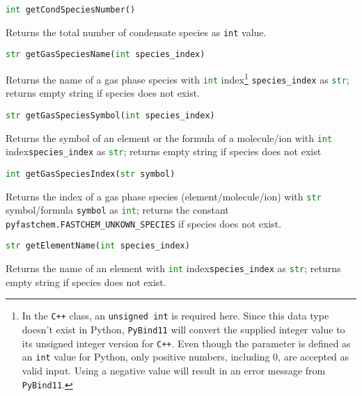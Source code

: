 \documentclass[numbers=noenddot]{aux/fcmanual}
\newcommand{\cpp}{\ttt{C++}\xspace}
\newcommand{\pb}{\texttt{PyBind11}\xspace}
\newcommand{\ttt}[1]{\texttt {#1}}
\begin{document}
\bigbreak

\lstinline[language=Python]!int getCondSpeciesNumber()!
\begin{addmargin}[25pt]{0pt}
	Returns the total number of condensate species as \lstinline!int! value.
\end{addmargin}

\bigbreak

\lstinline[language=Python]!str getGasSpeciesName(int species_index)!
\begin{addmargin}[25pt]{0pt}
	Returns the name of a gas phase species with \lstinline[language=Python]!int! index\footnote{In the \cpp class, an \lstinline!unsigned int! is required here. Since this data type doesn't exist in Python, \pb will convert the supplied integer value to its unsigned integer version for \cpp. Even though the parameter is defined as an \lstinline!int! value for Python, only positive numbers, including 0, are accepted as valid input. Using a negative value will result in an error message from \pb.} \lstinline!species_index! as \lstinline[language=Python]!str!; returns empty string if species does not exist.
\end{addmargin}  

\bigbreak

\lstinline[language=Python]!str getGasSpeciesSymbol(int species_index)!
\begin{addmargin}[25pt]{0pt}
	Returns the symbol of an element or the formula of a molecule/ion with \lstinline[language=Python]!int! index\footnotemark[\value{footnote}] \lstinline!species_index! as \lstinline[language=Python]!str!; returns empty string if species does not exist
\end{addmargin}

\bigbreak

\lstinline[language=Python]!int getGasSpeciesIndex(str symbol)!
\begin{addmargin}[25pt]{0pt}
	Returns the index of a gas phase species (element/molecule/ion) with \lstinline[language=Python]!str! symbol/formula \lstinline!symbol! as \lstinline[language=Python]!int!; returns the constant \lstinline!pyfastchem.FASTCHEM_UNKOWN_SPECIES! if species does not exist.
\end{addmargin}




\bigbreak

\lstinline[language=Python]!str getElementName(int species_index)!
\begin{addmargin}[25pt]{0pt}
	Returns the name of an element with \lstinline[language=Python]!int! index\footnotemark[\value{footnote}] \lstinline!species_index! as \lstinline[language=Python]!str!; returns empty string if species does not exist.
\end{addmargin}  
\end{document}
